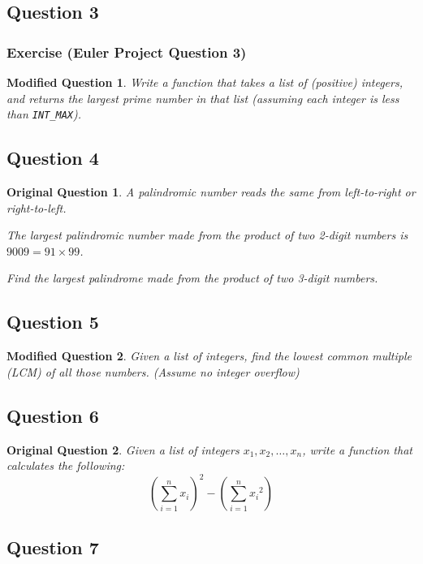 \documentclass[12pt]{article}
\newtheorem*{modQuestion*}{Modified Question}
\newtheorem*{origQuestion*}{Original Question}
\begin{document}
\subsection*{Question 3} 
\subsubsection*{Exercise (Euler Project Question 3)}

\begin{modQuestion*}
Write a function that takes a list of (positive) integers, and returns the largest prime number in that list (assuming each integer is less than \texttt{INT\_MAX}).
\end{modQuestion*}

\subsection*{Question 4} 
\begin{origQuestion*}
A palindromic number reads the same from left-to-right or right-to-left. 

The largest palindromic number made from the product of two 2-digit numbers is $9009 = 91 \times 99$.

Find the largest palindrome made from the product of two 3-digit numbers.
\end{origQuestion*}

\subsection*{Question 5} 

\begin{modQuestion*}
Given a list of integers, find the lowest common multiple (LCM) of all those numbers. (Assume no integer overflow)
\end{modQuestion*}
\subsection*{Question 6} 
\begin{origQuestion*}
Given a list of integers $x_1, x_2, \ldots, x_n$, write a function that calculates the following:
\[
\left(\sum_{i=1}^n x_i\right)^2 - \left(\sum_{i=1}^n {x_i}^2\right)
\]
\end{origQuestion*}
\subsection*{Question 7} 
\end{document}
